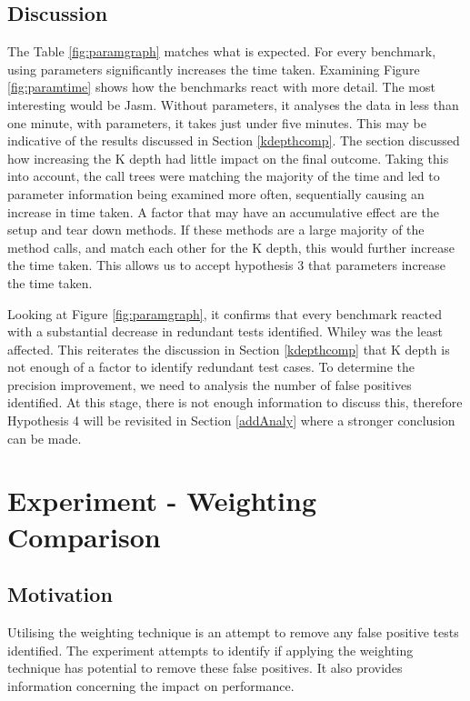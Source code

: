 \subsection{Discussion}
The Table \ref{fig:paramgraph} matches what is expected. For every benchmark, using parameters significantly increases the time taken. Examining Figure \ref{fig:paramtime} shows how the benchmarks react with more detail. The most interesting would be Jasm. Without parameters, it analyses the data in less than one minute, with parameters, it takes just under five minutes. This may be indicative of the results discussed in Section \ref{kdepthcomp}. The section discussed how increasing the K depth had little impact on the final outcome. Taking this into account, the call trees were matching the majority of the time and led to parameter information being examined more often, sequentially causing an increase in time taken. A factor that may have an accumulative effect are the setup and tear down methods. If these methods are a large majority of the method calls, and match each other for the K depth, this would further increase the time taken. This allows us to accept hypothesis 3 that parameters increase the time taken.

Looking at Figure \ref{fig:paramgraph}, it confirms that every benchmark reacted with a substantial decrease in redundant tests identified. Whiley was the least affected. This reiterates the discussion in Section \ref{kdepthcomp} that K depth is not enough of a factor to identify redundant test cases. To determine the precision improvement, we need to analysis the number of false positives identified.  At this stage, there is not enough information to discuss this, therefore Hypothesis 4 will be revisited in Section \ref{addAnaly} where a stronger conclusion can be made.

\section{Experiment  - Weighting Comparison}
\label{sec:weight}

\subsection{Motivation}
Utilising the weighting technique is an attempt to remove any false positive tests identified. The experiment attempts to identify if applying the weighting technique has potential to remove these false positives. It also provides information concerning the impact on performance.

